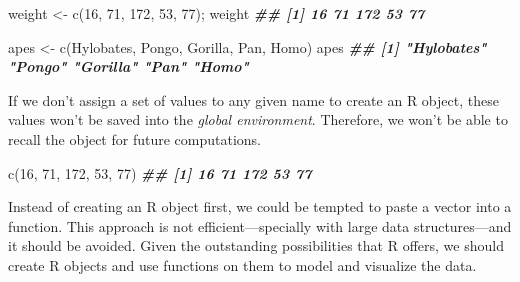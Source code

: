 \documentclass[
]{book}
\newenvironment{Shaded}{\begin{snugshade}}{\end{snugshade}}
\newcommand{\DecValTok}[1]{\textcolor[rgb]{0.00,0.00,0.81}{#1}}
\newcommand{\DocumentationTok}[1]{\textcolor[rgb]{0.56,0.35,0.01}{\textbf{\textit{#1}}}}
\newcommand{\FunctionTok}[1]{\textcolor[rgb]{0.00,0.00,0.00}{#1}}
\newcommand{\NormalTok}[1]{#1}
\newcommand{\OtherTok}[1]{\textcolor[rgb]{0.56,0.35,0.01}{#1}}
\newcommand{\StringTok}[1]{\textcolor[rgb]{0.31,0.60,0.02}{#1}}
\theoremstyle{definition}
\theoremstyle{definition}
\theoremstyle{definition}
\theoremstyle{definition}
\theoremstyle{remark}
\begin{document}
\begin{Shaded}
\begin{Highlighting}[]

\NormalTok{weight }\OtherTok{\textless{}{-}} \FunctionTok{c}\NormalTok{(}\DecValTok{16}\NormalTok{, }\DecValTok{71}\NormalTok{, }\DecValTok{172}\NormalTok{, }\DecValTok{53}\NormalTok{, }\DecValTok{77}\NormalTok{); weight}
\DocumentationTok{\#\# [1]  16  71 172  53  77}

\NormalTok{apes }\OtherTok{\textless{}{-}} \FunctionTok{c}\NormalTok{(}\StringTok{\textquotesingle{}Hylobates\textquotesingle{}}\NormalTok{, }\StringTok{\textquotesingle{}Pongo\textquotesingle{}}\NormalTok{, }\StringTok{\textquotesingle{}Gorilla\textquotesingle{}}\NormalTok{, }\StringTok{\textquotesingle{}Pan\textquotesingle{}}\NormalTok{, }\StringTok{\textquotesingle{}Homo\textquotesingle{}}\NormalTok{)}
\NormalTok{apes}
\DocumentationTok{\#\# [1] "Hylobates" "Pongo"     "Gorilla"   "Pan"       "Homo"}
\end{Highlighting}
\end{Shaded}

If we don't assign a set of values to any given name to create an R object, these values won't be saved into the \emph{global environment}. Therefore, we won't be able to recall the object for future computations.

\begin{Shaded}
\begin{Highlighting}[]

\FunctionTok{c}\NormalTok{(}\DecValTok{16}\NormalTok{, }\DecValTok{71}\NormalTok{, }\DecValTok{172}\NormalTok{, }\DecValTok{53}\NormalTok{, }\DecValTok{77}\NormalTok{)}
\DocumentationTok{\#\# [1]  16  71 172  53  77}
\end{Highlighting}
\end{Shaded}

Instead of creating an R object first, we could be tempted to paste a vector into a function. This approach is not efficient---specially with large data structures---and it should be avoided. Given the outstanding possibilities that R offers, we should create R objects and use functions on them to model and visualize the data.
\end{document}
